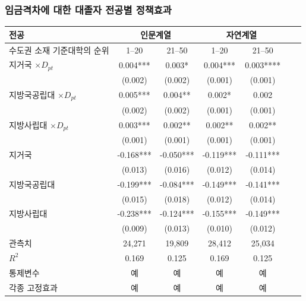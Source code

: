 \documentclass[aspectratio=169,xcolor=dvipsnames,handout]{beamer}
\begin{document}
\begin{frame}
    \frametitle{임금격차에 대한 대졸자 전공별 정책효과}
    \begin{table}[ht]
        \tiny
        \centering
        \begin{tabular}{lcccccc}
        \toprule
        \textbf{전공} & \multicolumn{2}{c}{\textbf{인문계열}}& \multicolumn{2}{c}{\textbf{자연계열}} \\
        \midrule                                                                                  
        수도권 소재 기준대학의 순위    & 1--20     & 21--50    & 1--20     & 21--50    \\
        \midrule                                                          
        지거국 $\times D_{pt}$                         & 0.004***  & 0.003*    & 0.004***  & 0.003**** \\
                                                     & (0.002)   & (0.002)   & (0.001)   & (0.001)   \\
        지방국공립대 $\times D_{pt}$  & 0.005***  & 0.004**   & 0.002*    & 0.002     \\
                                                     & (0.002)   & (0.002)   & (0.001)   & (0.001)   \\
        지방사립대 $\times D_{pt}$ & 0.003***  & 0.002**   & 0.002**   & 0.002**   \\
                                                     & (0.001)   & (0.001)   & (0.001)   & (0.001)   \\
        지거국                                         & -0.168*** & -0.050*** & -0.119*** & -0.111*** \\
                                                     & (0.013)   & (0.016)   & (0.012)   & (0.014)   \\
        지방국공립대                  & -0.199*** & -0.084*** & -0.149*** & -0.141*** \\
                                                     & (0.015)   & (0.018)   & (0.012)   & (0.014)   \\
        지방사립대                 & -0.238*** & -0.124*** & -0.155*** & -0.149*** \\
                                                     & (0.009)   & (0.013)   & (0.010)   & (0.012)   \\
        \midrule                                                          
        관측치                                 & 24,271    & 19,809    & 28,412    & 25,034    \\
        $R^2$                                    & 0.169     & 0.125     & 0.169     & 0.125     \\
        통제변수                                     & 예       & 예       & 예       & 예       \\
        각종 고정효과                                          & 예       & 예       & 예       & 예       \\
        \bottomrule
        \end{tabular}
    \end{table}
\end{frame}
\end{document}
